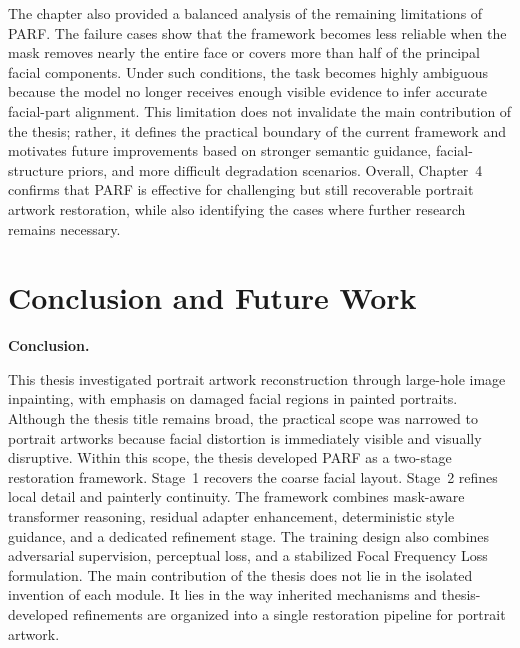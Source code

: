 \documentclass[12pt, twoside]{report}
\begin{document}
The chapter also provided a balanced analysis of the remaining limitations of PARF. The failure cases show that the framework becomes less reliable when the mask removes nearly the entire face or covers more than half of the principal facial components. Under such conditions, the task becomes highly ambiguous because the model no longer receives enough visible evidence to infer accurate facial-part alignment. This limitation does not invalidate the main contribution of the thesis; rather, it defines the practical boundary of the current framework and motivates future improvements based on stronger semantic guidance, facial-structure priors, and more difficult degradation scenarios. Overall, Chapter~4 confirms that PARF is effective for challenging but still recoverable portrait artwork restoration, while also identifying the cases where further research remains necessary.

\chapter{Conclusion and Future Work}

\noindent\textbf{Conclusion.}\par
This thesis investigated portrait artwork reconstruction through large-hole image inpainting, with emphasis on damaged facial regions in painted portraits. Although the thesis title remains broad, the practical scope was narrowed to portrait artworks because facial distortion is immediately visible and visually disruptive. Within this scope, the thesis developed PARF as a two-stage restoration framework. Stage~1 recovers the coarse facial layout. Stage~2 refines local detail and painterly continuity. The framework combines mask-aware transformer reasoning, residual adapter enhancement, deterministic style guidance, and a dedicated refinement stage. The training design also combines adversarial supervision, perceptual loss, and a stabilized Focal Frequency Loss formulation. The main contribution of the thesis does not lie in the isolated invention of each module. It lies in the way inherited mechanisms and thesis-developed refinements are organized into a single restoration pipeline for portrait artwork.
\end{document}

